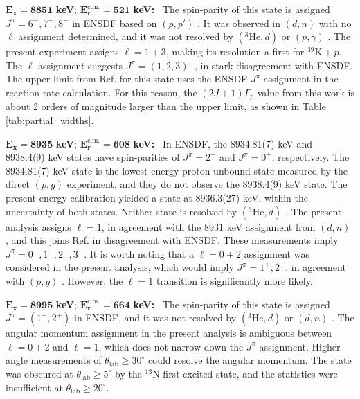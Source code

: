 \emph{$\mathbf{E_{x} = 8851}$} \textbf{keV}; \emph{$\mathbf{E^{\boldsymbol{\mathrm{c.m.}}}_{r} = 521}$} \textbf{keV:} \, 
The spin-parity of this state is assigned $J^{\pi} = 6^{-}, 7^{-}, 8^{-}$ in ENSDF based on $(p, p')$ \cite{Gruhn1972}. It was observed in $(d, n)$ \cite{Fuchs1969} with no $\ell$ assignment determined, and it was not resolved by $(^{3}\mathrm{He},d)$ \cite{Erskine1966,Seth1967,Cage1971} or $(p,\gamma)$ \cite{Kikstra1990,Cheng1981,Leenhouts1966}. The present experiment assigns $\ell=1+3$, making its resolution a first for $^{39}\mathrm{K}+p$. The $\ell$ assignment suggests $J^{\pi} = (1, 2, 3)^{-}$, in stark disagreement with ENSDF. The upper limit from Ref. \cite{Longland2018} for this state uses the ENSDF $J^{\pi}$ assignment in the reaction rate calculation. For this reason, the $(2J+1)\Gamma_{p}$ value from this work is about 2 orders of magnitude larger than the upper limit, as shown in Table \ref{tab:partial_widths}.

\emph{$\mathbf{E_{x} = 8935}$} \textbf{keV}; \emph{$\mathbf{E^{\boldsymbol{\mathrm{c.m.}}}_{r} = 608}$} \textbf{keV:} \, 
In ENSDF, the 8934.81(7) keV and 8938.4(9) keV states have spin-parities of $J^{\pi} = 2^{+}$ and $J^{\pi} = 0^{+}$, respectively. The 8934.81(7) keV state is the lowest energy proton-unbound state measured by the direct $(p,g)$ \cite{Kikstra1990} experiment, and they do not observe the 8938.4(9) keV state. The present energy calibration yielded a state at 8936.3(27) keV, within the uncertainty of both states. Neither state is resolved by $(^{3}\mathrm{He},d)$ \cite{Erskine1966,Seth1967,Cage1971}. The present analysis assigns $\ell=1$, in agreement with the 8931 keV assignment from $(d,n)$ \cite{Fuchs1969}, and this joins Ref. \cite{Fuchs1969} in disagreement with ENSDF. These measurements imply $J^{\pi} = 0^{-},1^{-},2^{-},3^{-}$. It is worth noting that a $\ell=0+2$ assignment was considered in the present analysis, which would imply $J^{\pi} = 1^{+},2^{+}$, in agreement with $(p,g)$ \cite{Kikstra1990}. However, the $\ell=1$ transition is significantly more likely.

\emph{$\mathbf{E_{x} = 8995}$} \textbf{keV}; \emph{$\mathbf{E^{\boldsymbol{\mathrm{c.m.}}}_{r} = 664}$} \textbf{keV:} \, 
The spin-parity of this state is assigned $J^{\pi} = (1^{-},2^{+})$ in ENSDF, and it was not resolved by $(^{3}\mathrm{He},d)$ \cite{Erskine1966,Seth1967,Cage1971} or $(d,n)$ \cite{Fuchs1969}. The angular momentum assignment in the present analysis is ambiguous between $\ell=0+2$ and $\ell=1$, which does not narrow down the $J^{\pi}$ assignment. Higher angle measurements of $\theta_{\mathrm{lab}} \geq 30^{\circ}$ could resolve the angular momentum. The state was obscured at $\theta_{\mathrm{lab}} \geq 5^{\circ}$ by the $^{13}$N first excited state, and the statistics were insufficient at $\theta_{\mathrm{lab}} \geq 20^{\circ}$.

